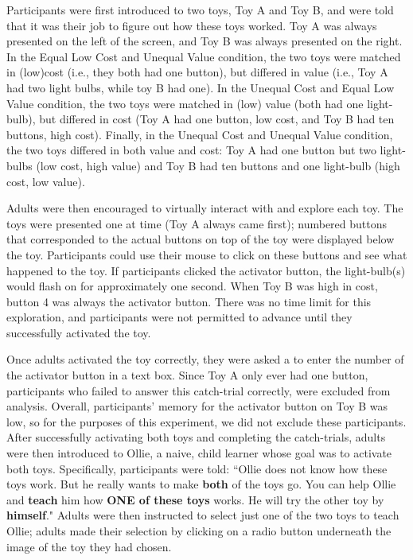 \documentclass[10pt,letterpaper]{article}
\begin{document}
Participants were first introduced to two toys, Toy A and Toy B, and were told that it was their job to figure out how these toys worked. Toy A was always presented on the left of the screen, and Toy B was always presented on the right. In the Equal Low Cost and Unequal Value condition, the two toys were matched in (low)cost (i.e., they both had one button), but differed in value (i.e., Toy A had two light bulbs, while toy B had one). In the Unequal Cost and Equal Low Value condition, the two toys were matched in (low) value (both had one light-bulb), but differed in cost (Toy A had one button, low cost, and Toy B had ten buttons, high cost). Finally, in the Unequal Cost and Unequal Value condition, the two toys differed in both value and cost: Toy A had one button but two light-bulbs (low cost, high value) and Toy B had ten buttons and one light-bulb (high cost, low value). 

Adults were then encouraged to virtually interact with and explore each toy. The toys were presented one at time (Toy A always came first); numbered buttons that corresponded to the actual buttons on top of the toy were displayed below the toy. Participants could use their mouse to click on these buttons and see what happened to the toy. If participants clicked the activator button, the light-bulb(s) would flash on for approximately one second. When Toy B was high in cost, button 4 was always the activator button. There was no time limit for this exploration, and participants were not permitted to advance until they successfully activated the toy. 

Once adults activated the toy correctly, they were asked a to enter the number of the activator button in a text box. Since Toy A only ever had one button, participants who failed to answer this catch-trial correctly, were excluded from analysis. Overall, participants' memory for the activator button on Toy B was low, so for the purposes of this experiment, we did not exclude these participants. After successfully activating both toys and completing the catch-trials, adults were then introduced to Ollie, a naive, child learner whose goal was to activate both toys. Specifically, participants were told: ``Ollie does not know how these toys work. But he really wants to make \textbf{both} of the toys go. You can help Ollie and \textbf{teach} him how \textbf{ONE of these toys} works. He will try the other toy by \textbf{himself}." Adults were then instructed to select just one of the two toys to teach Ollie; adults made their selection by clicking on a radio button underneath the image of the toy they had chosen. 
\end{document}
